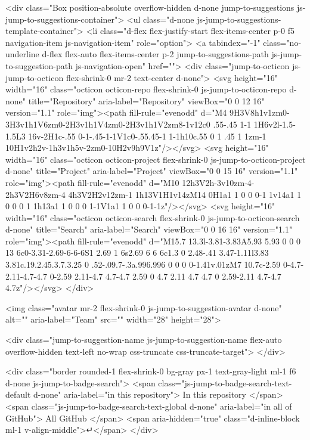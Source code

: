             <div class="Box position-absolute overflow-hidden d-none jump-to-suggestions js-jump-to-suggestions-container">
              <ul class="d-none js-jump-to-suggestions-template-container">
                <li class="d-flex flex-justify-start flex-items-center p-0 f5 navigation-item js-navigation-item" role="option">
                  <a tabindex="-1" class="no-underline d-flex flex-auto flex-items-center p-2 jump-to-suggestions-path js-jump-to-suggestion-path js-navigation-open" href="">
                    <div class="jump-to-octicon js-jump-to-octicon flex-shrink-0 mr-2 text-center d-none">
                      <svg height="16" width="16" class="octicon octicon-repo flex-shrink-0 js-jump-to-octicon-repo d-none" title="Repository" aria-label="Repository" viewBox="0 0 12 16" version="1.1" role="img"><path fill-rule="evenodd" d="M4 9H3V8h1v1zm0-3H3v1h1V6zm0-2H3v1h1V4zm0-2H3v1h1V2zm8-1v12c0 .55-.45 1-1 1H6v2l-1.5-1.5L3 16v-2H1c-.55 0-1-.45-1-1V1c0-.55.45-1 1-1h10c.55 0 1 .45 1 1zm-1 10H1v2h2v-1h3v1h5v-2zm0-10H2v9h9V1z"/></svg>
                      <svg height="16" width="16" class="octicon octicon-project flex-shrink-0 js-jump-to-octicon-project d-none" title="Project" aria-label="Project" viewBox="0 0 15 16" version="1.1" role="img"><path fill-rule="evenodd" d="M10 12h3V2h-3v10zm-4-2h3V2H6v8zm-4 4h3V2H2v12zm-1 1h13V1H1v14zM14 0H1a1 1 0 0 0-1 1v14a1 1 0 0 0 1 1h13a1 1 0 0 0 1-1V1a1 1 0 0 0-1-1z"/></svg>
                      <svg height="16" width="16" class="octicon octicon-search flex-shrink-0 js-jump-to-octicon-search d-none" title="Search" aria-label="Search" viewBox="0 0 16 16" version="1.1" role="img"><path fill-rule="evenodd" d="M15.7 13.3l-3.81-3.83A5.93 5.93 0 0 0 13 6c0-3.31-2.69-6-6-6S1 2.69 1 6s2.69 6 6 6c1.3 0 2.48-.41 3.47-1.11l3.83 3.81c.19.2.45.3.7.3.25 0 .52-.09.7-.3a.996.996 0 0 0 0-1.41v.01zM7 10.7c-2.59 0-4.7-2.11-4.7-4.7 0-2.59 2.11-4.7 4.7-4.7 2.59 0 4.7 2.11 4.7 4.7 0 2.59-2.11 4.7-4.7 4.7z"/></svg>
                    </div>

                    <img class="avatar mr-2 flex-shrink-0 js-jump-to-suggestion-avatar d-none" alt="" aria-label="Team" src="" width="28" height="28">

                    <div class="jump-to-suggestion-name js-jump-to-suggestion-name flex-auto overflow-hidden text-left no-wrap css-truncate css-truncate-target">
                    </div>

                    <div class="border rounded-1 flex-shrink-0 bg-gray px-1 text-gray-light ml-1 f6 d-none js-jump-to-badge-search">
                      <span class="js-jump-to-badge-search-text-default d-none" aria-label="in this repository">
                        In this repository
                      </span>
                      <span class="js-jump-to-badge-search-text-global d-none" aria-label="in all of GitHub">
                        All GitHub
                      </span>
                      <span aria-hidden="true" class="d-inline-block ml-1 v-align-middle">↵</span>
                    </div>

